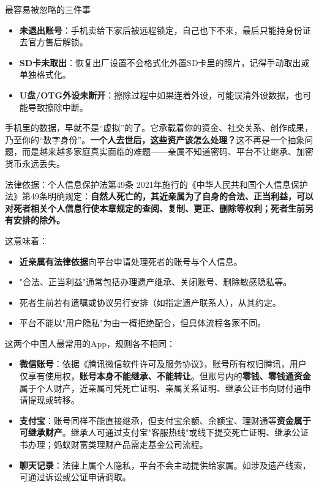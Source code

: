 \begin{tcbwarn}{最容易被忽略的三件事}
\begin{itemize}
  \item \textbf{未退出账号}：手机卖给下家后被远程锁定，自己也下不来，最后只能持身份证去官方售后解锁。
  \item \textbf{SD卡未取出}：恢复出厂设置不会格式化外置SD卡里的照片，记得手动取出或单独格式化。
  \item \textbf{U盘/OTG外设未断开}：擦除过程中如果连着外设，可能误清外设数据，也可能导致擦除中断。
\end{itemize}

\end{tcbwarn}


手机里的数据，早就不是“虚拟”的了。它承载着你的资金、社交关系、创作成果，乃至你的“数字身份”。\textbf{一个人去世后，这些资产该怎么处理？}这不再是一个抽象问题，而是越来越多家庭真实面临的难题——亲属不知道密码、平台不让继承、加密货币永远丢失。

\begin{tcbinfo}{法律依据：个人信息保护法第49条}
2021年施行的《中华人民共和国个人信息保护法》第49条明确规定：\textbf{自然人死亡的，其近亲属为了自身的合法、正当利益，可以对死者相关个人信息行使本章规定的查阅、复制、更正、删除等权利；死者生前另有安排的除外。}

这意味着：

\begin{itemize}
  \item \textbf{近亲属有法律依据}向平台申请处理死者的账号与个人信息。
  \item "合法、正当利益"通常包括办理遗产继承、关闭账号、删除敏感隐私等。
  \item 死者生前若有遗嘱或协议另行安排（如指定遗产联系人），从其约定。
  \item 平台不能以"用户隐私"为由一概拒绝配合，但具体流程各家不同。
\end{itemize}

\end{tcbinfo}


这两个中国人最常用的App，规则各不相同：

\begin{itemize}
  \item \textbf{微信账号}：依据《腾讯微信软件许可及服务协议》，账号所有权归腾讯，用户仅享有使用权，\textbf{账号本身不能继承、不能转让}。但账号内的\textbf{零钱、零钱通资金}属于个人财产，近亲属可凭死亡证明、亲属关系证明、继承公证书向财付通申请提现或转移。
  \item \textbf{支付宝}：账号同样不能直接继承，但支付宝余额、余额宝、理财通等\textbf{资金属于可继承财产}。继承人可通过支付宝"客服热线"或线下提交死亡证明、继承公证书办理；蚂蚁财富类理财产品需走基金公司流程。
  \item \textbf{聊天记录}：法律上属个人隐私，平台不会主动提供给家属。如涉及遗产线索，可通过诉讼或公证申请调取。
\end{itemize}

